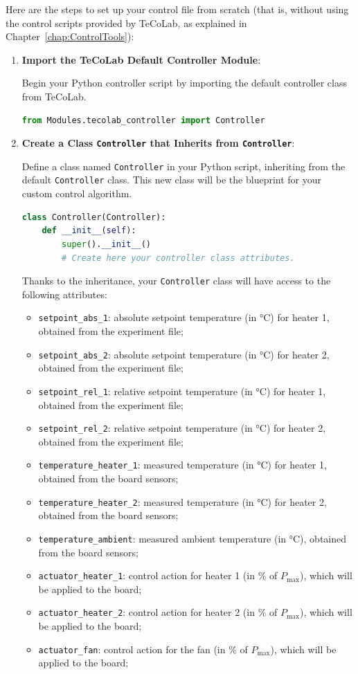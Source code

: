 \documentclass[12pt]{report}
\begin{document}
Here are the steps to set up your control file from scratch (that is, without using the control scripts provided by TeCoLab, as explained in Chapter~\ref{chap:ControlTools}):

\begin{enumerate}
\item \textbf{Import the TeCoLab Default Controller Module}:

Begin your Python controller script by importing the default controller class from TeCoLab.
\begin{lstlisting}[language = Python]
from Modules.tecolab_controller import Controller
\end{lstlisting}

\item \textbf{Create a Class \texttt{Controller} that Inherits from \texttt{Controller}}:

Define a class named \texttt{Controller} in your Python script, inheriting from the default \texttt{Controller} class. This new class will be the blueprint for your custom control algorithm.

\begin{lstlisting}[language = Python, tabsize = 2]
class Controller(Controller):
	def __init__(self):
		super().__init__()
		# Create here your controller class attributes.
\end{lstlisting}

Thanks to the inheritance, your \texttt{Controller} class will have access to the following attributes:

\begin{itemize}
\item \texttt{setpoint\_abs\_1}: absolute setpoint temperature (in °C) for heater 1, obtained from the experiment file;
\item \texttt{setpoint\_abs\_2}: absolute setpoint temperature (in °C) for heater 2, obtained from the experiment file;
\item \texttt{setpoint\_rel\_1}: relative setpoint temperature (in °C) for heater 1, obtained from the experiment file;
\item \texttt{setpoint\_rel\_2}: relative setpoint temperature (in °C) for heater 2, obtained from the experiment file;
\item \texttt{temperature\_heater\_1}: measured temperature (in °C) for heater 1, obtained from the board sensors;
\item \texttt{temperature\_heater\_2}: measured temperature (in °C) for heater 2, obtained from the board  sensors;
\item \texttt{temperature\_ambient}: measured ambient temperature (in °C), obtained from the board sensors;
\item \texttt{actuator\_heater\_1}: control action for heater 1 (in \% of $P_{\text{max}}$), which will be applied to the board;
\item \texttt{actuator\_heater\_2}: control action for heater 2 (in \% of $P_{\text{max}}$), which will be applied to the board;
\item \texttt{actuator\_fan}: control action for the fan (in \% of $P_{\text{max}}$), which will be applied to the board;
\end{itemize}


\end{enumerate}
\end{document}
